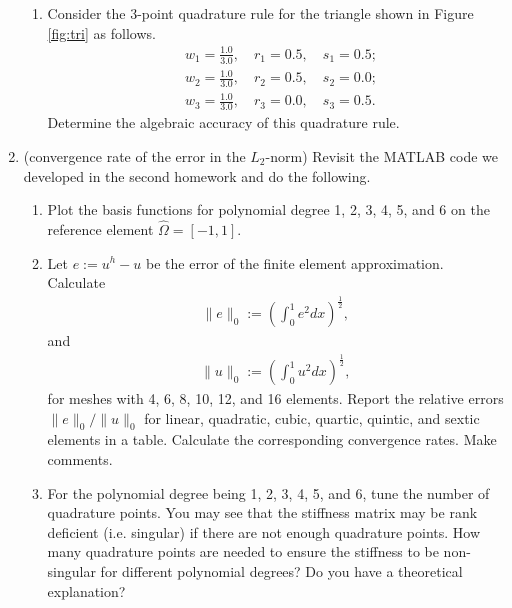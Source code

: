 \documentclass[12pt]{article}
\begin{document}
\begin{enumerate}
\begin{enumerate}
\item Consider the 3-point quadrature rule for the triangle shown in Figure \ref{fig:tri} as follows.
\begin{align*}
&w_1 = \frac{1.0}{3.0}, \quad r_1 = 0.5, \quad s_1 = 0.5; \\
&w_2= \frac{1.0}{3.0}, \quad r_2 = 0.5, \quad s_2 = 0.0;\\
&w_3 = \frac{1.0}{3.0}, \quad r_3 = 0.0, \quad s_3 = 0.5.
\end{align*}
Determine the algebraic accuracy of this quadrature rule.
\end{enumerate}



\item (convergence rate of the error in the $L_2$-norm) Revisit the MATLAB code we developed in the second homework and do the following.
\begin{enumerate}
\item Plot the basis functions for polynomial degree 1, 2, 3, 4, 5, and 6 on the reference element $\hat{\Omega}=[-1,1]$.
\item Let $e:=u^h - u$ be the error of the finite element approximation. Calculate
\begin{align*}
\|e\|_0 := \left( \int_0^1  e^2 dx \right)^{\frac12},
\end{align*}
and 
\begin{align*}
\|u\|_0 := \left( \int_0^1  u^2 dx \right)^{\frac12},
\end{align*}
for meshes with 4, 6, 8, 10, 12, and 16 elements. Report the relative errors $\|e\|_0/\|u\|_0$ for linear, quadratic, cubic, quartic, quintic, and sextic elements in a table. Calculate the corresponding convergence rates. Make comments.
\item For the polynomial degree being 1, 2, 3, 4, 5, and 6, tune the number of quadrature points. You may see that the stiffness matrix may be rank deficient (i.e. singular) if there are not enough quadrature points. How many quadrature points are needed to ensure the stiffness to be non-singular for different polynomial degrees? Do you have a theoretical explanation?
\end{enumerate}
\end{enumerate}
\end{document}
